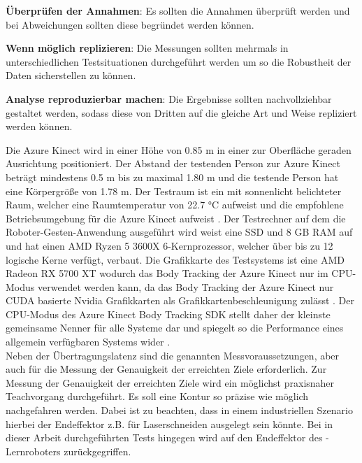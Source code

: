 \begin{compactenumerate}
    \item \textbf{Überprüfen der Annahmen}: Es sollten die Annahmen überprüft werden und bei Abweichungen sollten diese begründet werden können.
    \item \textbf{Wenn möglich replizieren}: Die Messungen sollten mehrmals in unterschiedlichen Testsituationen durchgeführt werden um so die Robustheit der Daten sicherstellen zu können.
    \item \textbf{Analyse reproduzierbar machen}: Die Ergebnisse sollten nachvollziehbar gestaltet werden, sodass diese von Dritten auf die gleiche Art und Weise repliziert werden können.
\end{compactenumerate}

Die Azure Kinect wird in einer Höhe von \num{0,85} m in einer zur Oberfläche geraden Ausrichtung positioniert. Der Abstand der testenden Person zur Azure Kinect beträgt mindestens \num{0,5} m bis zu maximal \num{1,80} m und die testende Person hat eine Körpergröße von \num{1,78} m. Der Testraum ist ein mit sonnenlicht belichteter Raum, welcher eine Raumtemperatur von \num{22,7} °C aufweist und die empfohlene Betriebsumgebung für die Azure Kinect aufweist \cite{tesych_azure_nodate}. Der Testrechner auf dem die Roboter-Gesten-Anwendung ausgeführt wird weist eine SSD und 8 GB RAM auf und hat einen AMD Ryzen 5 3600X 6-Kernprozessor, welcher über bis zu 12 logische Kerne verfügt, verbaut. Die Grafikkarte des Testsystems ist eine AMD Radeon RX 5700 XT wodurch das Body Tracking der Azure Kinect nur im CPU-Modus verwendet werden kann, da das Body Tracking der Azure Kinect nur CUDA basierte Nvidia Grafikkarten als Grafikkartenbeschleunigung zulässt \cite{encausse_body_nodate}. Der CPU-Modus des Azure Kinect Body Tracking SDK stellt daher der kleinste gemeinsame Nenner für alle Systeme dar und spiegelt so die Performance eines allgemein verfügbaren Systems wider \cite{azure_kinect_legacy_nodate}.\\

Neben der Übertragungslatenz sind die genannten Messvoraussetzungen, aber auch für die Messung der Genauigkeit der erreichten Ziele erforderlich. Zur Messung der Genauigkeit der erreichten Ziele wird ein möglichst praxisnaher Teachvorgang durchgeführt. Es soll eine Kontur so präzise wie möglich nachgefahren werden. Dabei ist zu beachten, dass in einem industriellen Szenario hierbei der Endeffektor z.B. für Laserschneiden ausgelegt sein könnte. Bei in dieser Arbeit durchgeführten Tests hingegen wird auf den Endeffektor des -Lernroboters zurückgegriffen.

